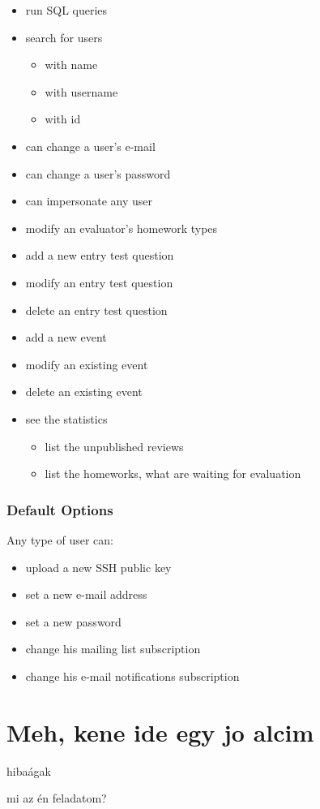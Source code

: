 \begin{itemize}
	\item run SQL queries
	\item search for users
	\begin{itemize}
		\item with name
		\item with username
		\item with id
	\end{itemize}
	\item can change a user's e-mail
	\item can change a user's password
	\item can impersonate any user
	\item modify an evaluator's homework types
	\item add a new entry test question
	\item modify an entry test question
	\item delete an entry test question
	\item add a new event
	\item modify an existing event
	\item delete an existing event
	\item see the statistics
	\begin{itemize}
		\item list the unpublished reviews
		\item list the homeworks, what are waiting for evaluation
	\end{itemize}
\end{itemize}

\subsubsection{Default Options}

Any type of user can:

\begin{itemize}
	\item upload a new SSH public key
	\item set a new e-mail address
	\item set a new password
	\item change his mailing list subscription
	\item change his e-mail notifications subscription
\end{itemize}

\section{Meh, kene ide egy jo alcim}


hibaágak


mi az én feladatom?